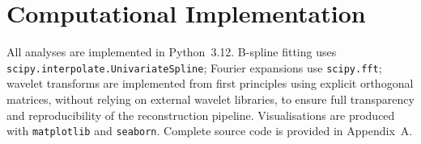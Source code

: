 \section{Computational Implementation}
\label{sec:implementation}

All analyses are implemented in Python~3.12. B-spline fitting uses
\texttt{scipy.interpolate.UnivariateSpline}; Fourier expansions use
\texttt{scipy.fft}; wavelet transforms are implemented from first principles
using explicit orthogonal matrices, without relying on external wavelet
libraries, to ensure full transparency and reproducibility of the reconstruction
pipeline. Visualisations are produced with \texttt{matplotlib} and
\texttt{seaborn}. Complete source code is provided in Appendix~A.
